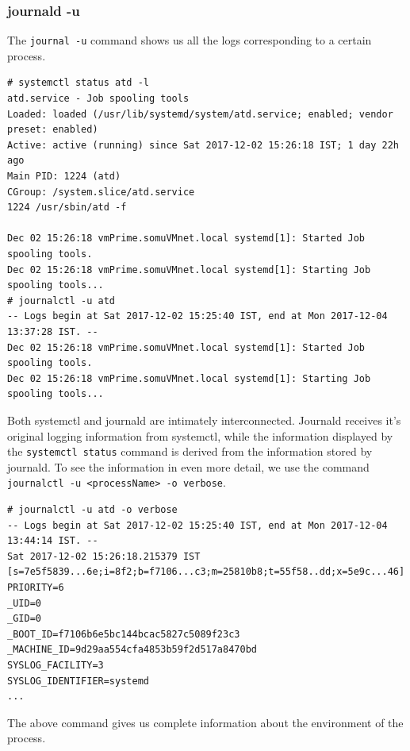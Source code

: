 \subsubsection{journald -u}
\vspace{-10pt}
The \verb|journal -u| command shows us all the logs corresponding to a certain process. 

\vspace{-15pt}
\begin{verbatim}
# systemctl status atd -l
atd.service - Job spooling tools
Loaded: loaded (/usr/lib/systemd/system/atd.service; enabled; vendor preset: enabled)
Active: active (running) since Sat 2017-12-02 15:26:18 IST; 1 day 22h ago
Main PID: 1224 (atd)
CGroup: /system.slice/atd.service
1224 /usr/sbin/atd -f

Dec 02 15:26:18 vmPrime.somuVMnet.local systemd[1]: Started Job spooling tools.
Dec 02 15:26:18 vmPrime.somuVMnet.local systemd[1]: Starting Job spooling tools...
# journalctl -u atd
-- Logs begin at Sat 2017-12-02 15:25:40 IST, end at Mon 2017-12-04 13:37:28 IST. --
Dec 02 15:26:18 vmPrime.somuVMnet.local systemd[1]: Started Job spooling tools.
Dec 02 15:26:18 vmPrime.somuVMnet.local systemd[1]: Starting Job spooling tools...
\end{verbatim}
\vspace{-10pt}

\noindent
Both systemctl and journald are intimately interconnected. Journald receives it's original logging information from systemctl, while the information displayed by the \verb|systemctl status| command is derived from the information stored by journald. To see the information in even more detail, we use the command \verb|journalctl -u <processName> -o verbose|.

\vspace{-15pt}
\begin{verbatim}
# journalctl -u atd -o verbose
-- Logs begin at Sat 2017-12-02 15:25:40 IST, end at Mon 2017-12-04 13:44:14 IST. --
Sat 2017-12-02 15:26:18.215379 IST [s=7e5f5839...6e;i=8f2;b=f7106...c3;m=25810b8;t=55f58..dd;x=5e9c...46]
PRIORITY=6
_UID=0
_GID=0
_BOOT_ID=f7106b6e5bc144bcac5827c5089f23c3
_MACHINE_ID=9d29aa554cfa4853b59f2d517a8470bd
SYSLOG_FACILITY=3
SYSLOG_IDENTIFIER=systemd
...
\end{verbatim}
\vspace{-10pt}

\noindent
The above command gives us complete information about the environment of the process. 


